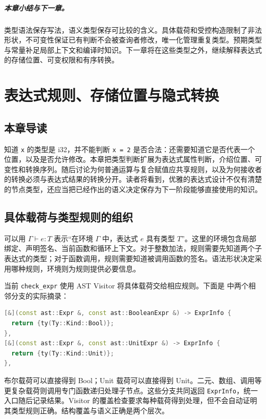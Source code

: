 \paragraph{本章小结与下一章。}
类型语法保存写法，语义类型保存可比较的含义。具体载荷和受控构造限制了非法形状，不可变性保证已有判断不会被查询者修改，唯一化管理重复类型。预期类型与常量补足局部上下文和编译时知识。下一章将在这些类型之外，继续解释表达式的存储位置、可变权限和有序转换。

\chapter{表达式规则、存储位置与隐式转换}
\label{chap:semantic-expressions}
\section*{本章导读}
知道 \lstinline[language=Rustless]|x| 的类型是 i32，并不能判断 \lstinline[language=Rustless]|x = 2| 是否合法：还需要知道它是否代表一个位置，以及是否允许修改。本章把类型判断扩展为表达式属性判断，介绍位置、可变性和转换序列。随后讨论为何普通运算与复合赋值应共享规则，以及为何接收者的转换必须与表达式结果的转换分开。读者将看到，优雅的表达式设计不仅有清楚的节点类型，还应当把已经作出的语义决定保存为下一阶段能够直接使用的知识。

\section{具体载荷与类型规则的组织}
可以用 $\Gamma\vdash e:T$ 表示“在环境 $\Gamma$ 中，表达式 $e$ 具有类型 $T$”。这里的环境包含局部绑定、声明签名、当前函数和循环上下文。对于整数加法，规则需要先知道两个子表达式的类型；对于函数调用，规则需要知道被调用函数的签名。语法形状决定采用哪种规则，环境则为规则提供必要信息。

当前 \texttt{check\_expr} 使用 AST Visitor 将具体载荷交给相应规则。下面是  中两个相邻分支的实际摘录：
\begin{lstlisting}[language=C++]
[&](const ast::Expr &, const ast::BooleanExpr &) -> ExprInfo {
  return {ty(Ty::Kind::Bool)};
},
[&](const ast::Expr &, const ast::UnitExpr &) -> ExprInfo {
  return {ty(Ty::Kind::Unit)};
},
\end{lstlisting}
布尔载荷可以直接得到 Bool；Unit 载荷可以直接得到 Unit。二元、数组、调用等更复杂载荷则调用专门函数递归处理子节点。这些分支共同返回 \texttt{ExprInfo}，统一入口随后记录结果。Visitor 的覆盖检查要求每种载荷得到处理，但不会自动证明其类型规则正确。结构覆盖与语义正确是两个层次。

